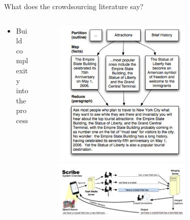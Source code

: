 \documentclass[presentation]{subfiles}
\begin{document}
\begin{frame}{What does the crowdsourcing literature say?}
\begin{columns}
  \begin{column}{0.5\textwidth}
    \begin{itemize}
      \item Build complexity into the process
    \end{itemize}
  \end{column}
  
  \begin{column}{0.5\textwidth}
    \begin{figure}
    \includegraphics[width=0.7\textwidth]{figures/mapReduce.png}

    \includegraphics[width=0.7\textwidth]{figures/complexity/cw_literature/scribe.png}
    \end{figure}
  \end{column}
  
\end{columns}
\end{frame}
\end{document}
